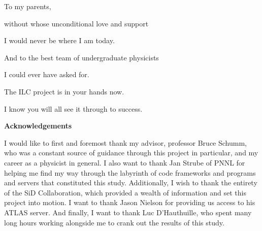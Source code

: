 \documentclass{report}
\begin{document}
    \tableofcontents


    \newpage \vspace*{\fill}
        \begin{center} \begin{large}
            To my parents, 
            
            without whose unconditional love and support
            
            I would never be where I am today.

            \vspace{40mm}

            And to the best team of undergraduate physicists
            
            I could ever have asked for.

            The ILC project is in your hands now.
            
            I know you will all see it through to success.
        \end{large} \end{center}
    \vspace*{\fill} \newpage \vspace*{\fill}
        \begin{center} \begin{large}
            \large \textbf{Acknowledgements} \vspace{\baselineskip}

            I would like to first and foremost thank my advisor, professor Bruce Schumm, who was a constant source of guidance through this project in particular, and my career as a physicist in general. I also want to thank Jan Strube of PNNL for helping me find my way through the labyrinth of code frameworks and programs and servers that constituted this study. Additionally, I wish to thank the entirety of the SiD Collaboration, which provided a wealth of information and set this project into motion. I want to thank Jason Nielson for providing us access to his ATLAS server. And finally, I want to thank Luc D'Hauthuille, who spent many long hours working alongside me to crank out the results of this study.
        \end{large} \end{center}
    \vspace*{\fill} \newpage
\end{document}
